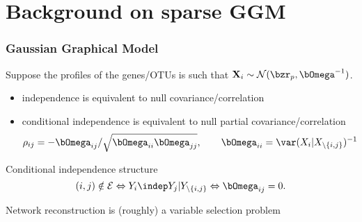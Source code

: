 \section{Background on sparse GGM}

\begin{frame}
  \frametitle{\alert{Gaussian} Graphical Model}

  Suppose   the   profiles   of    the   genes/OTUs   is   such   that
  $\mathbf{X}_i\sim\mathcal{N}(\bzr_p,\invcov^{-1})$.

  \begin{itemize}
  \item independence is equivalent to null covariance/correlation
  \item  \alert{  conditional  independence is  equivalent  to  null
      partial covariance/correlation}
    \begin{equation*}
      \label{eq:parcor2invcov}
      \rho_{ij}      =  -\invcov_{ij}      /
      \sqrt{\invcov_{ii} \invcov_{jj}}, \qquad \invcov_{ii}=
      \var(X_i|X_{\backslash \{i,j\}})^{-1}
    \end{equation*}
  \end{itemize}


  \begin{block}{Conditional independence structure}
    \vspace{-.5cm}
    \begin{equation*}
      (i,j)  \notin  \mathcal{E}  \Leftrightarrow  Y_i  \indep  Y_j  |
      Y_{\backslash \{i,j\}} \Leftrightarrow \invcov_{ij} = 0.
    \end{equation*}
  \end{block}

  \vspace{-.5cm}
  \vspace{-.5cm}

  \rsa Network reconstruction is (roughly) a variable selection problem
\end{frame}

